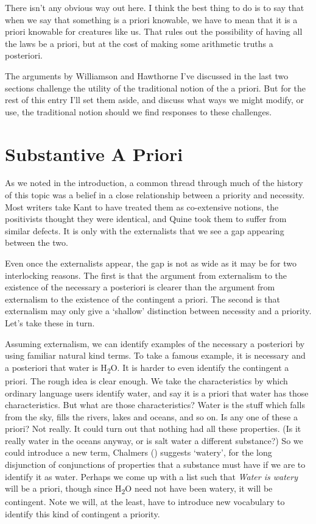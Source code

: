 \documentclass[
  11pt,
  letterpaper,
  DIV=11,
  numbers=noendperiod,
  twoside]{scrartcl}
\begin{document}
There isn't any obvious way out here. I think the best thing to do is to
say that when we say that something is a priori knowable, we have to
mean that it is a priori knowable for creatures like us. That rules out
the possibility of having all the laws be a priori, but at the cost of
making some arithmetic truths a posteriori.

The arguments by Williamson and Hawthorne I've discussed in the last two
sections challenge the utility of the traditional notion of the a
priori. But for the rest of this entry I'll set them aside, and discuss
what ways we might modify, or use, the traditional notion should we find
responses to these challenges.

\section{Substantive A Priori}\label{substantiveapriori}

As we noted in the introduction, a common thread through much of the
history of this topic was a belief in a close relationship between a
priority and necessity. Most writers take Kant to have treated them as
co-extensive notions, the positivists thought they were identical, and
Quine took them to suffer from similar defects. It is only with the
externalists that we see a gap appearing between the two.

Even once the externalists appear, the gap is not as wide as it may be
for two interlocking reasons. The first is that the argument from
externalism to the existence of the necessary a posteriori is clearer
than the argument from externalism to the existence of the contingent a
priori. The second is that externalism may only give a `shallow'
distinction between necessity and a priority. Let's take these in turn.

Assuming externalism, we can identify examples of the necessary a
posteriori by using familiar natural kind terms. To take a famous
example, it is necessary and a posteriori that water is
H\textsubscript{2}O. It is harder to even identify the contingent a
priori. The rough idea is clear enough. We take the characteristics by
which ordinary language users identify water, and say it is a priori
that water has those characteristics. But what are those
characteristics? Water is the stuff which falls from the sky, fills the
rivers, lakes and oceans, and so on. Is any one of these a priori? Not
really. It could turn out that nothing had all these properties. (Is it
really water in the oceans anyway, or is salt water a different
substance?) So we could introduce a new term, Chalmers
() suggests `watery', for the long
disjunction of conjunctions of properties that a substance must have if
we are to identify it as water. Perhaps we come up with a list such that
\emph{Water is watery} will be a priori, though since
H\textsubscript{2}O need not have been watery, it will be contingent.
Note we will, at the least, have to introduce new vocabulary to identify
this kind of contingent a priority.
\end{document}
